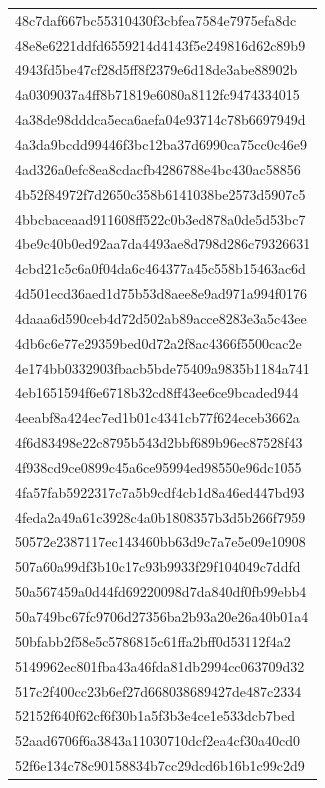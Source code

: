 \begin{tabular}{l}
48c7daf667bc55310430f3cbfea7584e7975efa8dc \\
48e8e6221ddfd6559214d4143f5e249816d62c89b9 \\
4943fd5be47cf28d5ff8f2379e6d18de3abe88902b \\
4a0309037a4ff8b71819e6080a8112fc9474334015 \\
4a38de98dddca5eca6aefa04e93714c78b6697949d \\
4a3da9bcdd99446f3bc12ba37d6990ca75cc0c46e9 \\
4ad326a0efc8ea8cdacfb4286788e4bc430ac58856 \\
4b52f84972f7d2650c358b6141038be2573d5907c5 \\
4bbcbaceaad911608ff522c0b3ed878a0de5d53bc7 \\
4be9c40b0ed92aa7da4493ae8d798d286c79326631 \\
4cbd21c5c6a0f04da6c464377a45c558b15463ac6d \\
4d501ecd36aed1d75b53d8aee8e9ad971a994f0176 \\
4daaa6d590ceb4d72d502ab89acce8283e3a5c43ee \\
4db6c6e77e29359bed0d72a2f8ac4366f5500cac2e \\
4e174bb0332903fbacb5bde75409a9835b1184a741 \\
4eb1651594f6e6718b32cd8ff43ee6ce9bcaded944 \\
4eeabf8a424ec7ed1b01c4341cb77f624eceb3662a \\
4f6d83498e22c8795b543d2bbf689b96ec87528f43 \\
4f938cd9ce0899c45a6ce95994ed98550e96dc1055 \\
4fa57fab5922317c7a5b9cdf4cb1d8a46ed447bd93 \\
4feda2a49a61c3928c4a0b1808357b3d5b266f7959 \\
50572e2387117ec143460bb63d9c7a7e5e09e10908 \\
507a60a99df3b10c17c93b9933f29f104049c7ddfd \\
50a567459a0d44fd69220098d7da840df0fb99ebb4 \\
50a749bc67fc9706d27356ba2b93a20e26a40b01a4 \\
50bfabb2f58e5c5786815c61ffa2bff0d53112f4a2 \\
5149962ec801fba43a46fda81db2994cc063709d32 \\
517c2f400cc23b6ef27d668038689427de487c2334 \\
52152f640f62cf6f30b1a5f3b3e4ce1e533dcb7bed \\
52aad6706f6a3843a11030710dcf2ea4cf30a40cd0 \\
52f6e134c78c90158834b7cc29dcd6b16b1c99c2d9 \\

\end{tabular}

